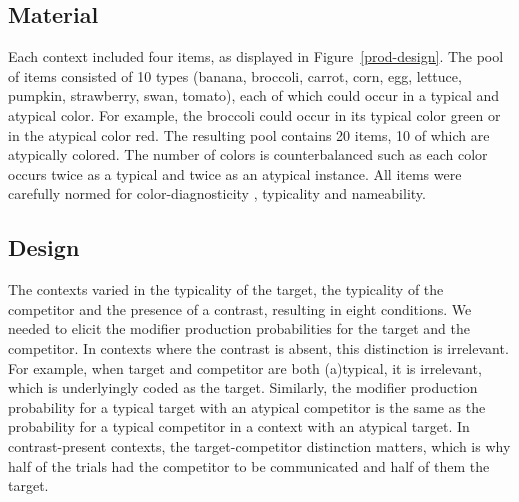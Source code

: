 \documentclass[10pt,letterpaper]{article}
\begin{document}


\subsection{Material} \label{Material}
Each context included four items, as displayed in Figure~\ref{prod-design}. The pool of items consisted of 10 types (banana, broccoli, carrot, corn, egg, lettuce, pumpkin, strawberry, swan, tomato), each of which could occur in a typical and atypical color. For example, the broccoli could occur in its typical color green or in the atypical color red. The resulting pool contains 20 items, 10 of which are atypically colored. The number of colors is counterbalanced such as each color occurs twice as a typical and twice as an atypical instance. All items were carefully normed for color-diagnosticity \cite{Tanaka:1999}, typicality and nameability.


\subsection{Design}
The contexts varied in the typicality of the target, the typicality of the competitor and the presence of a contrast, resulting in eight conditions. 
We needed to elicit the modifier production probabilities for the target and the competitor. In contexts where the contrast is absent, this distinction is irrelevant. For example, when target and competitor are both (a)typical, it is irrelevant, which is underlyingly coded as the target. Similarly, the modifier production probability for a typical target with an atypical competitor is the same as the probability for a typical competitor in a context with an atypical target. In contrast-present contexts, the target-competitor distinction matters, which is why half of the trials had the competitor to be communicated and half of them the target.
\end{document}
